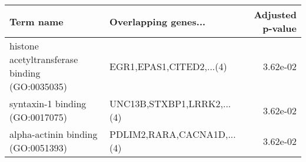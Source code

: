 \begin{tabular}{llr}
\toprule
                                     Term name &       Overlapping genes... &  Adjusted p-value \\
\midrule
histone acetyltransferase binding (GO:0035035) &   EGR1,EPAS1,CITED2,...(4) &          3.62e-02 \\
               syntaxin-1 binding (GO:0017075) & UNC13B,STXBP1,LRRK2,...(4) &          3.62e-02 \\
            alpha-actinin binding (GO:0051393) & PDLIM2,RARA,CACNA1D,...(4) &          3.62e-02 \\
\bottomrule
\end{tabular}
